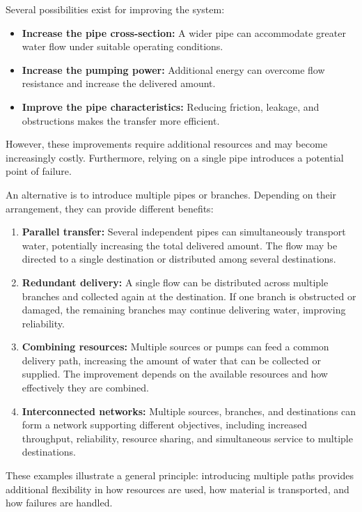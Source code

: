 Several possibilities exist for improving the system:
\begin{itemize}
	\item \textbf{Increase the pipe cross-section:}
	A wider pipe can accommodate greater water flow under suitable
	operating conditions.
	
	\item \textbf{Increase the pumping power:}
	Additional energy can overcome flow resistance and increase
	the delivered amount.
	
	\item \textbf{Improve the pipe characteristics:}
	Reducing friction, leakage, and obstructions makes the
	transfer more efficient.
\end{itemize}
%
However, these improvements require additional resources and may
become increasingly costly. Furthermore, relying on a single pipe
introduces a potential point of failure.

\vspace{10pt}
An alternative is to introduce multiple pipes or branches.
Depending on their arrangement, they can provide different benefits:

\begin{enumerate}
	\item \textbf{Parallel transfer:}
	Several independent pipes can simultaneously transport water,
	potentially increasing the total delivered amount. The flow
	may be directed to a single destination or distributed among
	several destinations.
	
	\item \textbf{Redundant delivery:}
	A single flow can be distributed across multiple branches
	and collected again at the destination. If one branch is
	obstructed or damaged, the remaining branches may continue
	delivering water, improving reliability.
	
	\item \textbf{Combining resources:}
	Multiple sources or pumps can feed a common delivery path,
	increasing the amount of water that can be collected or
	supplied. The improvement depends on the available resources
	and how effectively they are combined.
	
	\item \textbf{Interconnected networks:}
	Multiple sources, branches, and destinations can form a
	network supporting different objectives, including increased
	throughput, reliability, resource sharing, and simultaneous
	service to multiple destinations.
\end{enumerate}
%
These examples illustrate a general principle:
introducing multiple paths provides additional flexibility in
how resources are used, how material is transported, and how
failures are handled.

